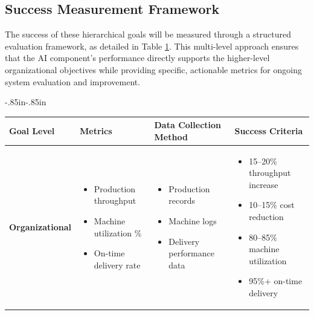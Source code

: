 \subsection{Success Measurement Framework}
The success of these hierarchical goals will be measured through a structured evaluation framework, as detailed in Table \ref{tab:success_metrics}. This multi-level approach ensures that the AI component's performance directly supports the higher-level organizational objectives while providing specific, actionable metrics for ongoing system evaluation and improvement.

\begin{table}[H]
    \begin{adjustwidth}{-.85in}{-.85in}
    \noindent
    \centering
    \label{tab:success_metrics}
    \small 
    \begin{tabularx}{1.3\textwidth}{|l|X|X|X|}
        \hline
        \textbf{Goal Level} & \textbf{Metrics} & \textbf{Data Collection Method} & \textbf{Success Criteria} \\
        \hline
        \textbf{Organizational} &
        \begin{itemize}[nosep,leftmargin=*,topsep=2pt, partopsep=0pt, itemsep=1pt]
            \item Production throughput
            \item Machine utilization \%
            \item On-time delivery rate
        \end{itemize} &
        \begin{itemize}[nosep,leftmargin=*,topsep=2pt, partopsep=0pt, itemsep=1pt]
            \item Production records
            \item Machine logs
            \item Delivery performance data
        \end{itemize} &
        \begin{itemize}[nosep,leftmargin=*,topsep=2pt, partopsep=0pt, itemsep=1pt]
            \item 15--20\% throughput increase
            \item 10--15\% cost reduction
            \item 80--85\% machine utilization
            \item 95\%+ on-time delivery
        \end{itemize} \\

\end{tabularx}
\end{adjustwidth}
\end{table}
